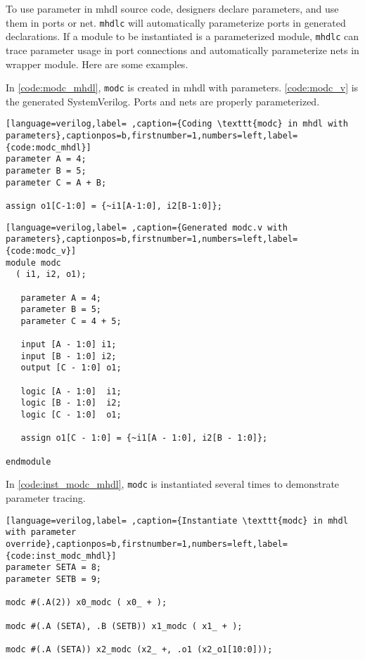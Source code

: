 \documentclass[10pt,oneside]{book}
\begin{document}
To use parameter in mhdl source code, designers declare parameters,
and use them in ports or net.  \texttt{mhdlc} will automatically parameterize
ports in generated declarations.  If a module to be instantiated is a
parameterized module, \texttt{mhdlc} can trace parameter usage in port
connections and automatically parameterize nets in wrapper
module. Here are some examples. 


In \autoref{code:modc_mhdl}, \texttt{modc} is created in mhdl with parameters.
\autoref{code:modc_v} is the generated SystemVerilog.  Ports and nets
are properly parameterized. 

\begin{lstlisting}[language=verilog,label= ,caption={Coding \texttt{modc} in mhdl with parameters},captionpos=b,firstnumber=1,numbers=left,label={code:modc_mhdl}]
parameter A = 4;
parameter B = 5;
parameter C = A + B;

assign o1[C-1:0] = {~i1[A-1:0], i2[B-1:0]};
\end{lstlisting}

\begin{lstlisting}[language=verilog,label= ,caption={Generated modc.v with parameters},captionpos=b,firstnumber=1,numbers=left,label={code:modc_v}]
module modc
  ( i1, i2, o1);

   parameter A = 4; 
   parameter B = 5; 
   parameter C = 4 + 5;

   input [A - 1:0] i1; 
   input [B - 1:0] i2; 
   output [C - 1:0] o1;

   logic [A - 1:0]  i1; 
   logic [B - 1:0]  i2; 
   logic [C - 1:0]  o1;

   assign o1[C - 1:0] = {~i1[A - 1:0], i2[B - 1:0]};

endmodule
\end{lstlisting}


In \autoref{code:inst_modc_mhdl}, \texttt{modc} is instantiated several times
to demonstrate parameter tracing. 

\begin{lstlisting}[language=verilog,label= ,caption={Instantiate \texttt{modc} in mhdl with parameter override},captionpos=b,firstnumber=1,numbers=left,label={code:inst_modc_mhdl}]
parameter SETA = 8;
parameter SETB = 9;

modc #(.A(2)) x0_modc ( x0_ + );

modc #(.A (SETA), .B (SETB)) x1_modc ( x1_ + );

modc #(.A (SETA)) x2_modc (x2_ +, .o1 (x2_o1[10:0]));
\end{lstlisting}
\end{document}
